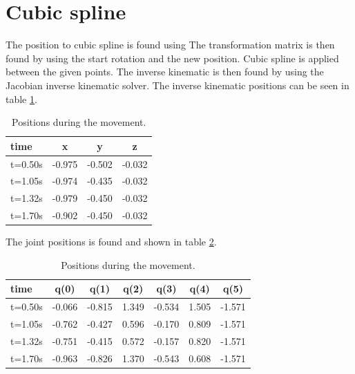 \section{Cubic spline}

The position to cubic spline is found using \cite[equation 5.23]{book:roboticNotes}
The transformation matrix is then found by using the start rotation and the new position.
Cubic spline is applied between the given points.
The inverse kinematic is then found by using the Jacobian inverse kinematic solver.
The inverse kinematic positions can be seen in table \ref{tb:positions}.

\begin{table}[h]
\centering
\begin{tabular}{l|*{3}{c} }
 time    & x      & y      & z      \\ \hline       
 t=0.50s & -0.975 & -0.502 & -0.032 \\
 t=1.05s & -0.974 & -0.435 & -0.032 \\
 t=1.32s & -0.979 & -0.450 & -0.032 \\
 t=1.70s & -0.902 & -0.450 & -0.032 \\
\end{tabular}
\caption{Positions during the movement.}
\label{tb:positions}
\end{table}

The joint positions is found and shown in table \ref{tb:joint_positions}.

\begin{table}[h]
\centering
\begin{tabular}{l|*{6}{c} }
 time    & q(0)   & q(1)   & q(2)  & q(3)   & q(4)  & q(5)   \\ \hline       
 t=0.50s & -0.066 & -0.815 & 1.349 & -0.534 & 1.505 & -1.571 \\
 t=1.05s & -0.762 & -0.427 & 0.596 & -0.170 & 0.809 & -1.571 \\
 t=1.32s & -0.751 & -0.415 & 0.572 & -0.157 & 0.820 & -1.571 \\
 t=1.70s & -0.963 & -0.826 & 1.370 & -0.543 & 0.608 & -1.571 \\
\end{tabular}
\caption{Positions during the movement.}
\label{tb:joint_positions}
\end{table}

